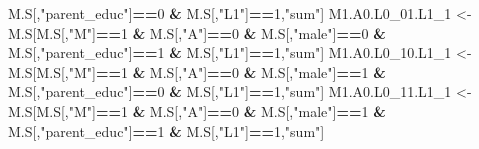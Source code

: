 \documentclass[
]{book}
\newenvironment{Shaded}{\begin{snugshade}}{\end{snugshade}}
\newcommand{\DecValTok}[1]{\textcolor[rgb]{0.00,0.00,0.81}{#1}}
\newcommand{\NormalTok}[1]{#1}
\newcommand{\OtherTok}[1]{\textcolor[rgb]{0.56,0.35,0.01}{#1}}
\newcommand{\SpecialCharTok}[1]{\textcolor[rgb]{0.81,0.36,0.00}{\textbf{#1}}}
\newcommand{\StringTok}[1]{\textcolor[rgb]{0.31,0.60,0.02}{#1}}
\begin{document}
\begin{Shaded}
\begin{Highlighting}[]
\NormalTok{                            M.S[,}\StringTok{"parent\_educ"}\NormalTok{]}\SpecialCharTok{==}\DecValTok{0} \SpecialCharTok{\&}\NormalTok{ M.S[,}\StringTok{"L1"}\NormalTok{]}\SpecialCharTok{==}\DecValTok{1}\NormalTok{,}\StringTok{"sum"}\NormalTok{]}
\NormalTok{  M1.A0.L0\_01.L1\_1 }\OtherTok{\textless{}{-}}\NormalTok{ M.S[M.S[,}\StringTok{"M"}\NormalTok{]}\SpecialCharTok{==}\DecValTok{1} \SpecialCharTok{\&}\NormalTok{ M.S[,}\StringTok{"A"}\NormalTok{]}\SpecialCharTok{==}\DecValTok{0} \SpecialCharTok{\&}\NormalTok{ M.S[,}\StringTok{"male"}\NormalTok{]}\SpecialCharTok{==}\DecValTok{0} \SpecialCharTok{\&} 
\NormalTok{                            M.S[,}\StringTok{"parent\_educ"}\NormalTok{]}\SpecialCharTok{==}\DecValTok{1} \SpecialCharTok{\&}\NormalTok{ M.S[,}\StringTok{"L1"}\NormalTok{]}\SpecialCharTok{==}\DecValTok{1}\NormalTok{,}\StringTok{"sum"}\NormalTok{]}
\NormalTok{  M1.A0.L0\_10.L1\_1 }\OtherTok{\textless{}{-}}\NormalTok{ M.S[M.S[,}\StringTok{"M"}\NormalTok{]}\SpecialCharTok{==}\DecValTok{1} \SpecialCharTok{\&}\NormalTok{ M.S[,}\StringTok{"A"}\NormalTok{]}\SpecialCharTok{==}\DecValTok{0} \SpecialCharTok{\&}\NormalTok{ M.S[,}\StringTok{"male"}\NormalTok{]}\SpecialCharTok{==}\DecValTok{1} \SpecialCharTok{\&} 
\NormalTok{                            M.S[,}\StringTok{"parent\_educ"}\NormalTok{]}\SpecialCharTok{==}\DecValTok{0} \SpecialCharTok{\&}\NormalTok{ M.S[,}\StringTok{"L1"}\NormalTok{]}\SpecialCharTok{==}\DecValTok{1}\NormalTok{,}\StringTok{"sum"}\NormalTok{]}
\NormalTok{  M1.A0.L0\_11.L1\_1 }\OtherTok{\textless{}{-}}\NormalTok{ M.S[M.S[,}\StringTok{"M"}\NormalTok{]}\SpecialCharTok{==}\DecValTok{1} \SpecialCharTok{\&}\NormalTok{ M.S[,}\StringTok{"A"}\NormalTok{]}\SpecialCharTok{==}\DecValTok{0} \SpecialCharTok{\&}\NormalTok{ M.S[,}\StringTok{"male"}\NormalTok{]}\SpecialCharTok{==}\DecValTok{1} \SpecialCharTok{\&} 
\NormalTok{                            M.S[,}\StringTok{"parent\_educ"}\NormalTok{]}\SpecialCharTok{==}\DecValTok{1} \SpecialCharTok{\&}\NormalTok{ M.S[,}\StringTok{"L1"}\NormalTok{]}\SpecialCharTok{==}\DecValTok{1}\NormalTok{,}\StringTok{"sum"}\NormalTok{]}
  

\end{Highlighting}
\end{Shaded}
\end{document}
